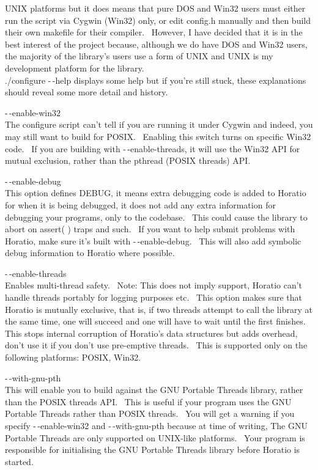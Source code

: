 \documentclass{article}
\begin{document}
UNIX platforms but it does means that pure DOS and Win32 users must
either run the script via Cygwin (Win32) only, or edit config.h
manually and then build their own makefile for their compiler.~
However, I have decided that it is in the best interest of the project
because, although we do have DOS and Win32 users, the majority of the
library's users use a form of UNIX and UNIX is my development platform
for the library.\\
./configure -$\,$-help displays some help but if you're still stuck, these
explanations
should reveal some more detail and history.
\par -$\,$-enable-win32\\
The configure script can't tell if you are running it under Cygwin and
indeed, you may still want to build for POSIX.~ Enabling this
switch turns on specific Win32 code.~ If you are building with
-$\,$-enable-threads, it will use the Win32 API for mutual exclusion,
rather than the pthread (POSIX threads) API.\\

\par -$\,$-enable-debug
\\
This option defines DEBUG, it means extra debugging code is added to
Horatio for when it is being debugged, it does not add any extra
information
for debugging your programs, only to the codebase.~ This could cause
the
library to abort on assert( ) traps and such.~ If you want to help
submit problems with Horatio, make sure it's built with
-$\,$-enable-debug.~
This will also add symbolic debug information to Horatio where
possible.\\

\par -$\,$-enable-threads
\\
Enables multi-thread safety.~ Note: This does not imply support,
Horatio can't handle threads portably for logging purposes etc.~
This option makes sure that Horatio is mutually exclusive, that is, if
two threads attempt to call the library at the same time, one will
succeed
and one will have to wait until the first finishes.~ This stops
internal
corruption of Horatio's data structures but adds overhead, don't use
it
if you don't use pre-emptive threads.~ This is supported only on
the
following platforms: POSIX, Win32.\\

\par -$\,$-with-gnu-pth\\
This will enable you to build against the GNU Portable Threads library,
rather than the POSIX threads API.~ This is useful if your program
uses the GNU Portable Threads rather than POSIX threads.~ You will
get a warning if you specify -$\,$-enable-win32 and -$\,$-with-gnu-pth because
at time of writing, The GNU Portable Threads are only supported on
UNIX-like platforms.~ Your program is responsible for initialising
the GNU Portable Threads library before Horatio is started.\\
\end{document}
